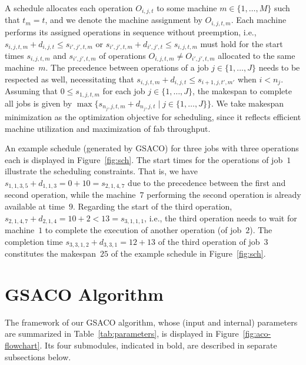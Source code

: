 \documentclass[runningheads]{llncs}
\begin{document}
A schedule allocates each operation $O_{i,j,t}$ to some machine
$m\in\{1,\dots,M\}$ such that $t_m=t$, and we denote the machine
assignment by $O_{i,j,t,m}$.
Each machine performs its assigned operations in sequence without
preemption, i.e.,
$s_{i,j,t,m} + d_{i,j,t} \leq s_{i',j',t,m}$ or
$s_{i',j',t,m} + d_{i',j',t} \leq s_{i,j,t,m}$
must hold for the start times
$s_{i,j,t,m}$ and $s_{i',j',t,m}$ of operations
$O_{i,j,t,m}\neq O_{i',j',t,m}$
allocated to the same machine~$m$.
The precedence between operations of a job $j\in\{1,\dots,J\}$ needs to be
respected as well, necessitating that
$s_{i,j,t,m} + d_{i,j,t} \leq s_{i+1,j,t',m'}$ when $i<n_j$.
Assuming that $0\leq s_{1,j,t,m}$ for each job $j\in\{1,\dots,J\}$,
the makespan to complete all jobs is given by
$\max\{s_{n_j,j,t,m} + d_{n_j,j,t} \mid j\in\{1,\dots,J\}\}$.
We take makespan minimization as the optimization objective for scheduling,
since it reflects efficient machine utilization and
maximization of fab throughput.

An example schedule (generated by GSACO) for three jobs with three
operations each is displayed in Figure~\ref{fig:sch}.
The start times for the operations of job~$1$ illustrate
the scheduling constraints.
That is, we have $s_{1,1,3,5} + d_{1,1,3} = 0 + 10 = s_{2,1,4,7}$
due to the precedence between the first and second operation,
while the machine~$7$ performing the second operation is already available
at time~$9$.
Regarding the start of the third operation,
$s_{2,1,4,7} + d_{2,1,4} = 10 + 2 < 13 = s_{3,1,1,1}$, i.e.,
the third operation needs to wait for machine~$1$ to complete
the execution of another operation (of job~$2$).
The completion time $s_{3,3,1,2} + d_{3,3,1} = 12 + 13$ of the third
operation of job~$3$ constitutes the makespan~$25$ of the example schedule in Figure~\ref{fig:sch}.

\section{GSACO Algorithm}
\label{sec:gsaco}

The framework of our %
GSACO algorithm, whose (input and internal) parameters are summarized in Table~\ref{tab:parameters},
is displayed in Figure~\ref{fig:aco-flowchart}.
Its four submodules, indicated in bold, are described in separate subsections below.
\end{document}
